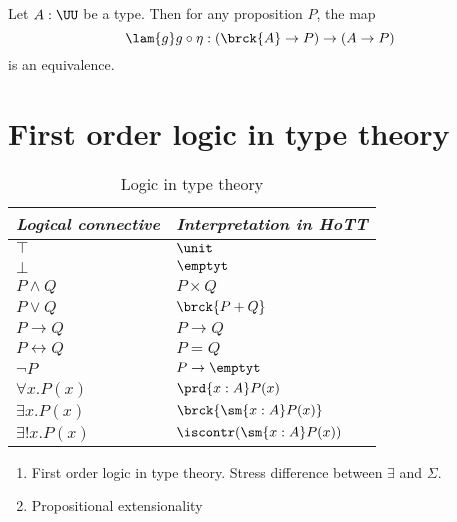 \begin{thm}
Let $A:\UU$ be a type. Then for any proposition $P$, the map
\begin{equation*}
\lam{g} g\circ \eta : (\brck{A}\to P)\to (A\to P)
\end{equation*}
is an equivalence.
\end{thm}

\section{First order logic in type theory}
\begin{table}
\caption{Logic in type theory}
\begin{center}
\begin{tabular}{ll}
\toprule
\emph{Logical connective} & \emph{Interpretation in HoTT} \\
\midrule
$\top$ & $\unit$ \\
$\bot$ & $\emptyt$ \\
$P\land Q$ & $P\times Q$ \\
$P\lor Q$ & $\brck{P+Q}$ \\
$P\to Q$ & $P\to Q$ \\
$P\leftrightarrow Q$ & $P=Q$ \\
$\neg P$ & $P\to\emptyt$ \\
$\forall x.P(x)$ & $\prd{x:A}P(x)$ \\
$\exists x.P(x)$ & $\brck{\sm{x:A}P(x)}$ \\
$\exists! x.P(x)$ & $\iscontr(\sm{x:A}P(x))$ \\
\bottomrule
\end{tabular}
\end{center}
\end{table}
\begin{enumerate}
\item First order logic in type theory. Stress difference between $\exists$ and $\Sigma$.
\item Propositional extensionality
\end{enumerate}

